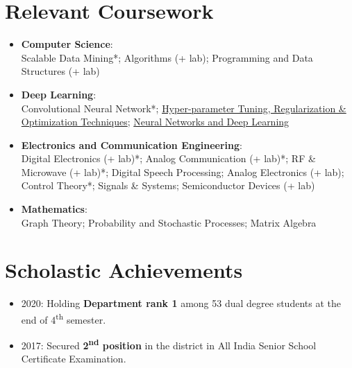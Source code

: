 \documentclass[letterpaper,11pt]{article}
\newcommand{\resumeItem}[2]{
  \item\small{
    \textbf{#1}{: #2 \vspace{-2pt}}
  }
}
\newcommand{\resumeSubItem}[2]{\resumeItem{#1}{#2}\vspace{-4pt}}
\newcommand{\resumeSubHeadingListStart}{\begin{itemize}[leftmargin=*]}
\newcommand{\resumeSubHeadingListEnd}{\end{itemize}}
\begin{document}
 \section{Relevant Coursework}
  \resumeSubHeadingListStart
    \resumeSubItem{Computer Science}
      {\\Scalable Data Mining*; Algorithms (+ lab); Programming and Data Structures (+ lab)}
    \resumeSubItem{Deep Learning}
      {\\Convolutional Neural Network*; \href{https://www.coursera.org/account/accomplishments/certificate/9UGVQFJCCS38}{Hyper-parameter Tuning, Regularization \& Optimization Techniques}; \href{https://www.coursera.org/account/accomplishments/certificate/9HS82Y4DP4DV}{Neural Networks and Deep Learning}}
    \resumeSubItem{Electronics and Communication Engineering}
      {\\Digital Electronics (+ lab)*; Analog Communication (+ lab)*; RF \& Microwave (+ lab)*; Digital Speech Processing; Analog Electronics (+ lab); Control Theory*; Signals \& Systems; Semiconductor Devices (+ lab)}
    \resumeSubItem{Mathematics}
      {\\Graph Theory; Probability and Stochastic Processes; Matrix Algebra}
  \resumeSubHeadingListEnd

\section{Scholastic Achievements}
  \resumeSubHeadingListStart
      \itemsep-0.5em
      \item{2020: Holding \textbf{Department rank 1} among 53 dual degree students at the end of 4\textsuperscript{th} semester.}
      \item{2017: Secured \textbf{2\textsuperscript{nd} position} in the district in All India Senior School Certificate Examination.}
      
  \resumeSubHeadingListEnd
  
\end{document}
